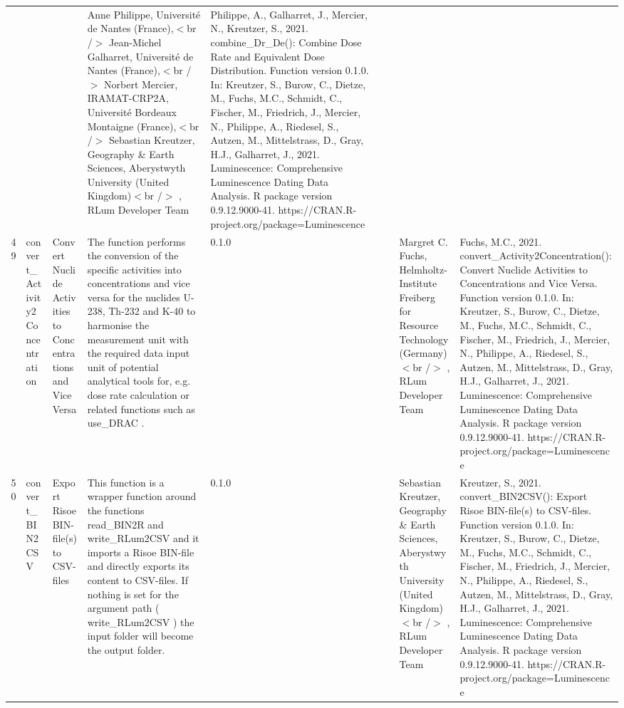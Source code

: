 \begin{table}[ht]
\begin{tabular}{rllllllll}
 &  &  & Anne Philippe, Université de Nantes (France),$<$br /$>$ Jean-Michel Galharret, Université de Nantes (France),$<$br /$>$ Norbert Mercier, IRAMAT-CRP2A, Université Bordeaux Montaigne (France),$<$br /$>$ Sebastian Kreutzer, Geography \& Earth Sciences, Aberystwyth University (United Kingdom)$<$br /$>$ , RLum Developer Team & Philippe, A., Galharret, J., Mercier, N., Kreutzer, S., 2021. combine\_Dr\_De(): Combine Dose Rate and Equivalent Dose Distribution. Function version 0.1.0. In: Kreutzer, S., Burow, C., Dietze, M., Fuchs, M.C., Schmidt, C., Fischer, M., Friedrich, J., Mercier, N., Philippe, A., Riedesel, S., Autzen, M., Mittelstrass, D., Gray, H.J., Galharret, J., 2021. Luminescence: Comprehensive Luminescence Dating Data Analysis. R package version 0.9.12.9000-41. https://CRAN.R-project.org/package=Luminescence
 \\ 
  49 & convert\_Activity2Concentration & Convert Nuclide Activities to Concentrations and Vice Versa & The function performs the conversion of the specific activities into concentrations and vice versa for the nuclides U-238, Th-232 and K-40 to harmonise the measurement unit with the required data input unit of potential analytical tools for, e.g. dose rate calculation or related functions such as  use\_DRAC . & 0.1.0
 &  &  & Margret C. Fuchs, Helmholtz-Institute Freiberg for Resource Technology (Germany)$<$br /$>$ , RLum Developer Team & Fuchs, M.C., 2021. convert\_Activity2Concentration(): Convert Nuclide Activities to Concentrations and Vice Versa. Function version 0.1.0. In: Kreutzer, S., Burow, C., Dietze, M., Fuchs, M.C., Schmidt, C., Fischer, M., Friedrich, J., Mercier, N., Philippe, A., Riedesel, S., Autzen, M., Mittelstrass, D., Gray, H.J., Galharret, J., 2021. Luminescence: Comprehensive Luminescence Dating Data Analysis. R package version 0.9.12.9000-41. https://CRAN.R-project.org/package=Luminescence
 \\ 
  50 & convert\_BIN2CSV & Export Risoe BIN-file(s) to CSV-files & This function is a wrapper function around the functions  read\_BIN2R  and write\_RLum2CSV  and it imports a Risoe BIN-file and directly exports its content to CSV-files. If nothing is set for the argument  path  ( write\_RLum2CSV ) the input folder will become the output folder. & 0.1.0
 &  &  & Sebastian Kreutzer, Geography \& Earth Sciences, Aberystwyth University (United Kingdom)$<$br /$>$ , RLum Developer Team & Kreutzer, S., 2021. convert\_BIN2CSV(): Export Risoe BIN-file(s) to CSV-files. Function version 0.1.0. In: Kreutzer, S., Burow, C., Dietze, M., Fuchs, M.C., Schmidt, C., Fischer, M., Friedrich, J., Mercier, N., Philippe, A., Riedesel, S., Autzen, M., Mittelstrass, D., Gray, H.J., Galharret, J., 2021. Luminescence: Comprehensive Luminescence Dating Data Analysis. R package version 0.9.12.9000-41. https://CRAN.R-project.org/package=Luminescence

\end{tabular}
\end{table}
